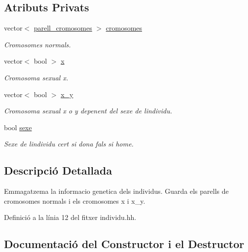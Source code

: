 \subsection*{Atributs Privats}
\begin{DoxyCompactItemize}
\item 
vector$<$ \hyperlink{classparell__cromosomes}{parell\+\_\+cromosomes} $>$ \hyperlink{classindividu_ae5e0a83ff9e943cbcdf95b74069ad3a7}{cromosomes}
\begin{DoxyCompactList}\small\item\em Cromosomes normals. \end{DoxyCompactList}\item 
vector$<$ bool $>$ \hyperlink{classindividu_a3c4abda8daead156b5519f69bd224fa9}{x}
\begin{DoxyCompactList}\small\item\em Cromosoma sexual x. \end{DoxyCompactList}\item 
vector$<$ bool $>$ \hyperlink{classindividu_a51eb7827fdd5bd5302e3c962fd719fc0}{x\+\_\+y}
\begin{DoxyCompactList}\small\item\em Cromosoma sexual x o y depenent del sexe de l\textquotesingle{}individu. \end{DoxyCompactList}\item 
bool \hyperlink{classindividu_ab62faa6985cc0520c33a206fc5a89e37}{sexe}
\begin{DoxyCompactList}\small\item\em Sexe de l\textquotesingle{}individu cert si dona fals si home. \end{DoxyCompactList}\end{DoxyCompactItemize}


\subsection{Descripció Detallada}
Emmagatzema la informacio genetica dels individus. Guarda els parells de cromosomes normals i els cromosomes x i x\+\_\+y. 

Definició a la línia 12 del fitxer individu.\+hh.



\subsection{Documentació del Constructor i el Destructor}
